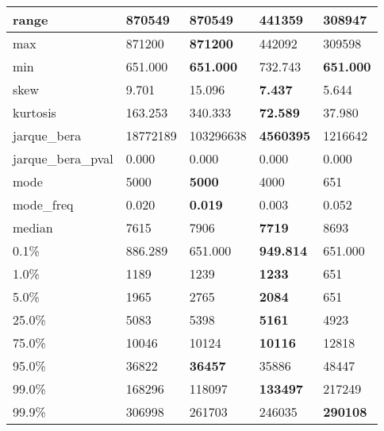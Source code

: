 \begin{table}[H]
\begin{tabular}{|l|m{10em}|m{10em}|m{10em}|m{10em}|}
\hline range & 870549 & \bfseries 870549 & 441359 & \cellcolor[rgb]{0.9, 0.54, 0.52} 308947 \\
\hline max & 871200 & \bfseries 871200 & 442092 & \cellcolor[rgb]{0.9, 0.54, 0.52} 309598 \\
\hline min & 651.000 & \bfseries 651.000 & \cellcolor[rgb]{0.9, 0.54, 0.52} 732.743 & \bfseries 651.000 \\
\hline skew & 9.701 & \cellcolor[rgb]{0.9, 0.54, 0.52} 15.096 & \bfseries 7.437 & 5.644 \\
\hline kurtosis & 163.253 & \cellcolor[rgb]{0.9, 0.54, 0.52} 340.333 & \bfseries 72.589 & 37.980 \\
\hline jarque\_bera & 18772189 & \cellcolor[rgb]{0.9, 0.54, 0.52} 103296638 & \bfseries 4560395 & 1216642 \\
\hline jarque\_bera\_pval & 0.000 & 0.000 & 0.000 & 0.000 \\
\hline mode & 5000 & \bfseries 5000 & 4000 & \cellcolor[rgb]{0.9, 0.54, 0.52} 651 \\
\hline mode\_freq & 0.020 & \bfseries 0.019 & 0.003 & \cellcolor[rgb]{0.9, 0.54, 0.52} 0.052 \\
\hline median & 7615 & 7906 & \bfseries 7719 & \cellcolor[rgb]{0.9, 0.54, 0.52} 8693 \\
\hline 0.1\% & 886.289 & \cellcolor[rgb]{0.9, 0.54, 0.52} 651.000 & \bfseries 949.814 & \cellcolor[rgb]{0.9, 0.54, 0.52} 651.000 \\
\hline 1.0\% & 1189 & 1239 & \bfseries 1233 & \cellcolor[rgb]{0.9, 0.54, 0.52} 651 \\
\hline 5.0\% & 1965 & 2765 & \bfseries 2084 & \cellcolor[rgb]{0.9, 0.54, 0.52} 651 \\
\hline 25.0\% & 5083 & \cellcolor[rgb]{0.9, 0.54, 0.52} 5398 & \bfseries 5161 & 4923 \\
\hline 75.0\% & 10046 & 10124 & \bfseries 10116 & \cellcolor[rgb]{0.9, 0.54, 0.52} 12818 \\
\hline 95.0\% & 36822 & \bfseries 36457 & 35886 & \cellcolor[rgb]{0.9, 0.54, 0.52} 48447 \\
\hline 99.0\% & 168296 & \cellcolor[rgb]{0.9, 0.54, 0.52} 118097 & \bfseries 133497 & 217249 \\
\hline 99.9\% & 306998 & 261703 & \cellcolor[rgb]{0.9, 0.54, 0.52} 246035 & \bfseries 290108 \\
\hline
\end{tabular}
\end{table}
